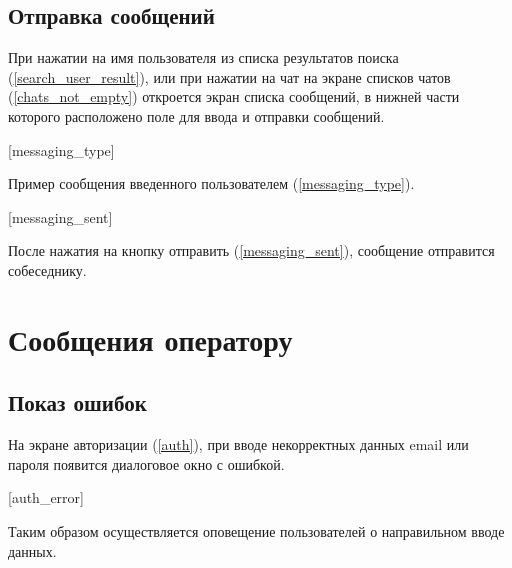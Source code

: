 \documentclass[opermanual]{espd}
\begin{document}
\subsection{Отправка сообщений}

При нажатии на имя пользователя из списка результатов поиска (\ref{search_user_result}), или при нажатии на чат на экране списков чатов (\ref{chats_not_empty}) откроется экран списка сообщений, в нижней части которого расположено поле для ввода и отправки сообщений.

[messaging_type]

Пример сообщения введенного пользователем (\ref{messaging_type}).

[messaging_sent]

После нажатия на кнопку отправить (\ref{messaging_sent}), сообщение отправится собеседнику.

\section{Сообщения оператору}

\subsection{Показ ошибок}

На экране авторизации (\ref{auth}), при вводе некорректных данных email или пароля появится диалоговое окно с ошибкой. 

[auth_error]

Таким образом осуществляется оповещение пользователей о направильном вводе данных.  
 
\end{document}
